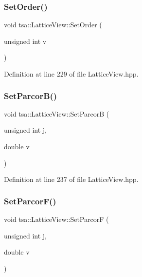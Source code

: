 \subsubsection{\texorpdfstring{Set\+Order()}{SetOrder()}}
{\footnotesize\ttfamily void tsa\+::\+Lattice\+View\+::\+Set\+Order (\begin{DoxyParamCaption}\item[{unsigned int}]{v }\end{DoxyParamCaption})\hspace{0.3cm}{\ttfamily [inline]}}



Definition at line 229 of file Lattice\+View.\+hpp.

\mbox{\label{classtsa_1_1_lattice_view_ae2bb756238fc6873839459097717f3dc}} 
\subsubsection{\texorpdfstring{Set\+Parcor\+B()}{SetParcorB()}}
{\footnotesize\ttfamily void tsa\+::\+Lattice\+View\+::\+Set\+ParcorB (\begin{DoxyParamCaption}\item[{unsigned int}]{j,  }\item[{double}]{v }\end{DoxyParamCaption})\hspace{0.3cm}{\ttfamily [inline]}}



Definition at line 237 of file Lattice\+View.\+hpp.

\mbox{\label{classtsa_1_1_lattice_view_a0e099a0196edb96d4e9265ea2901e6b9}} 
\subsubsection{\texorpdfstring{Set\+Parcor\+F()}{SetParcorF()}}
{\footnotesize\ttfamily void tsa\+::\+Lattice\+View\+::\+Set\+ParcorF (\begin{DoxyParamCaption}\item[{unsigned int}]{j,  }\item[{double}]{v }\end{DoxyParamCaption})\hspace{0.3cm}{\ttfamily [inline]}}




